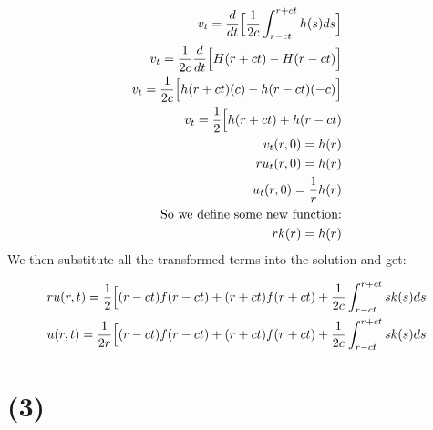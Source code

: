 \documentclass{article}
\begin{document}
\begin{equation}
\begin{aligned}
v_t = \frac{d}{dt} \Big{[}\frac{1}{2c}\int^{r+ct}_{r-ct}h(s)ds \Big{]}\\
v_t =\frac{1}{2c} \frac{d}{dt} \Big{[}H(r+ct) - H(r-ct) \Big{]}\\
v_t = \frac{1}{2c} \Big{[}h(r+ct)(c) - h(r-ct)(-c)\Big{]}\\
v_t = \frac{1}{2} \Big{[}h(r+ct) + h(r-ct)\\
v_t(r,0) = h(r)\\
ru_t(r,0) = h(r)\\
u_t(r,0) = \frac{1}{r}h(r)\\
\text{So we define some new function:}\\
rk(r) = h(r)
\end{aligned}
\end{equation}
We then substitute all the transformed terms into the solution and get:
\begin{tcolorbox}[minipage,colback=white,arc=0pt,outer arc=0pt]
\begin{equation}
\begin{aligned}
ru(r,t) = \frac{1}{2} \Big{[}(r-ct)f(r-ct) + (r+ct)f(r+ct) + \frac{1}{2c}\int_{r-ct}^{r+ct}sk(s)ds\\
u(r,t) = \frac{1}{2r} \Big{[}(r-ct)f(r-ct) + (r+ct)f(r+ct) + \frac{1}{2c}\int_{r-ct}^{r+ct}sk(s)ds\\
\end{aligned}
\end{equation}
\end{tcolorbox}
\section*{\textbf{(3)}}
\end{document}
